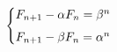 \documentclass[preview]{standalone}
\begin{document}
\begin{align*}
\special{dvisvgm:raw <g id='unique000'>}\begin{cases}F_{n+1}-\alpha F_n=\beta^n\\[4pt]F_{n+1}-\beta F_n=\alpha^n\end{cases}\special{dvisvgm:raw </g>}
\end{align*}
\end{document}
